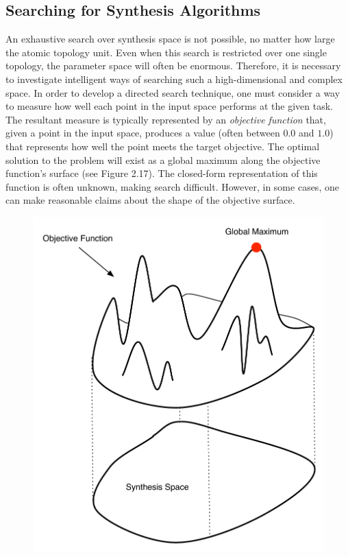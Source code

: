 \documentclass[a4paper,12pt]{report} 	%
\numberwithin{figure}{chapter}
\numberwithin{table}{chapter}
\numberwithin{equation}{chapter}
\begin{document}
\begin{flushleft}
\subsection{Searching for Synthesis Algorithms}
An exhaustive search over synthesis space is not possible, no matter how large the atomic topology unit. Even when this search is restricted over one single topology, the parameter space will often be enormous. Therefore, it is necessary to investigate intelligent ways of searching such a high-dimensional and complex space. In order to develop a directed search technique, one must consider a way to measure how well each point in the input space performs at the given task. The resultant measure is typically represented by an \emph{objective function} that, given a point in the input space, produces a value (often between $0.0$ and $1.0$) that represents how well the point meets the target objective. The optimal solution to the problem will exist as a global maximum along the objective function's surface (see Figure 2.17). The closed-form representation of this function is often unknown, making search difficult. However, in some cases, one can make reasonable claims about the shape of the objective surface.
\\
\begin{figure}[h!]
\begin{center}
\includegraphics[scale=0.7]{FitnessFunction}

\end{center}
\end{figure}
\end{flushleft}
\end{document}
